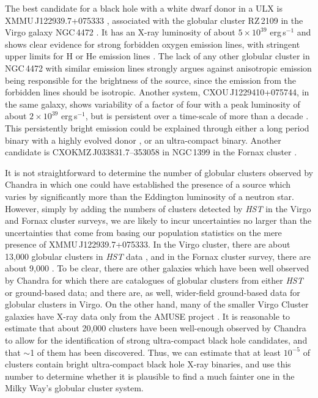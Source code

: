 \documentclass[a4paper,fleqn,usenatbib]{mnras}
\begin{document}
The best candidate for a black hole with a white dwarf donor in a ULX is XMMU\,J122939.7+075333 \citep{2007Natur.445..183M}, associated with the globular cluster RZ\,2109 in the Virgo galaxy NGC\,4472 \citep{2001AJ....121..210R}. It has an X-ray luminosity of about $5\times10^{39}$ erg\,s$^{-1}$ and shows clear evidence for strong forbidden oxygen emission lines, with stringent upper limits for H or He emission lines \citep{2007ApJ...669L..69Z, 2008ApJ...683L.139Z, 2014ApJ...785..147S}. The lack of any other globular cluster in NGC\,4472 with similar emission lines \citep{2012ApJ...752...90P} strongly argues against anisotropic emission being responsible for the brightness of the source, since the emission from the forbidden lines should be isotropic. Another system, CXOU\,J1229410+075744, in the same galaxy, shows variability of a factor of four with a peak luminosity of about $2\times10^{39}$ erg\,s$^{-1}$, but is persistent over a time-scale of more than a decade \citep{2011MNRAS.410.1655M}. This persistently bright emission could be explained through either a long period binary with a highly evolved donor \citep[e.g.,][]{2006MNRAS.368L..25T}, or an ultra-compact binary. Another candidate is CXOKMZ\,J033831.7--353058 in NGC\,1399 in the Fornax cluster \citep{2010ApJ...721..323S}.

It is not straightforward to determine the number of globular clusters observed by Chandra in which one could have established the presence of a source which varies by significantly more than the Eddington luminosity of a neutron star. However, simply by adding the numbers of clusters detected by {\it HST} in the Virgo and Fornax cluster surveys, we are likely to incur uncertainties no larger than the uncertainties that come from basing our population statistics on the mere presence of XMMU\,J122939.7+075333. In the Virgo cluster, there are about 13,000 globular clusters in {\it HST} data \citep{2009ApJS..180...54J}, and in the Fornax cluster survey, there are about 9,000 \citep{2015ApJS..221...13J}. To be clear, there are other galaxies which have been well observed by Chandra for which there are catalogues of globular clusters from either {\it HST} or ground-based data; and there are, as well, wider-field ground-based data for globular clusters in Virgo. On the other hand, many of the smaller Virgo Cluster galaxies have X-ray data only from the AMUSE project \citep{2008ApJ...680..154G}. It is reasonable to estimate that about 20,000 clusters have been well-enough observed by Chandra to allow for the identification of strong ultra-compact black hole candidates, and that $\sim$1 of them has been discovered. Thus, we can estimate that at least $10^{-5}$ of clusters contain bright ultra-compact black hole X-ray binaries, and use this number to determine whether it is plausible to find a much fainter one in the Milky Way's globular cluster system.
 
\end{document}
